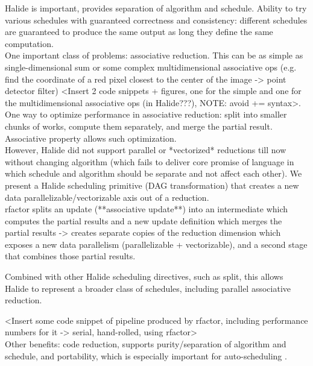 Halide \cite{Ragan-Kelley:2013:HLC:2491956.2462176} is important, provides separation of algorithm and schedule. Ability to try various schedules with guaranteed correctness and consistency: different schedules are guaranteed to produce the same output as long they define the same computation. \\

One important class of problems: associative reduction. This can be as simple as single-dimensional sum or some complex multidimensional associative ops (e.g. find the coordinate of a red pixel closest to the center of the image -> point detector filter) <Insert 2 code snippets + figures, one for the simple and one for the multidimensional associative ops (in Halide???), NOTE: avoid += syntax>. One way to optimize performance in associative reduction: split into smaller chunks of works, compute them separately, and merge the partial result. Associative property allows such optimization. \\

However, Halide did not support parallel or *vectorized* reductions till now without changing algorithm (which fails to deliver core promise of language in which schedule and algorithm should be separate and not affect each other). We present a Halide scheduling primitive (DAG transformation) that creates a new data parallelizable/vectorizable axis out of a reduction. \\

rfactor splits an update (**associative update**) into an intermediate which computes the partial results and a new update definition which merges the partial results -> creates separate copies of the reduction dimension which exposes a new data parallelism (parallelizable + vectorizable), and a second stage that combines those partial results. 

Combined with other Halide scheduling directives, such as split, this allows Halide to represent a broader class of schedules, including parallel associative reduction. 

<Insert some code snippet of pipeline produced by rfactor, including performance numbers for it -> serial, hand-rolled, using rfactor> \\

Other benefits: code reduction, supports purity/separation of algorithm and schedule, and portability, which is especially important for auto-scheduling \cite{Mullapudi:2016:ASH:2897824.2925952}. \\
